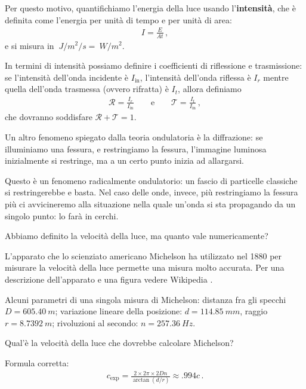 \documentclass{article}
\begin{document}
Per questo motivo, quantifichiamo l'energia della luce usando l'\textbf{intensità}, che è definita come l'energia per unità di tempo e per unità di area: 
%
\begin{align}
I = \frac{E}{A t}
\,,
\end{align}
%
e si misura in \(\SI{}{J / m^2 / s}  = \SI{}{W/m^2}\). 

In termini di intensità possiamo definire i coefficienti di riflessione e trasmissione: se l'intensità dell'onda incidente è \(I _{\text{in}}\), l'intensità dell'onda riflessa è \(I_{r}\) mentre quella dell'onda trasmessa (ovvero rifratta) è \(I_{t}\), allora definiamo 
%
\begin{align}
\mathcal{R} = \frac{I_r}{I _{\text{in}}}
\qquad \text{e} \qquad
\mathcal{T} = \frac{I_t}{I _{\text{in}}}
\,,
\end{align}
%
che dovranno soddisfare \(\mathcal{R} + \mathcal{T} = 1\).

Un altro fenomeno spiegato dalla teoria ondulatoria è la diffrazione: se illuminiamo una fessura, e restringiamo la fessura, l'immagine luminosa inizialmente si restringe, ma a un certo punto inizia ad allargarsi.

Questo è un fenomeno radicalmente ondulatorio: un fascio di particelle classiche si restringerebbe e basta.
Nel caso delle onde, invece, più restringiamo la fessura più ci avvicineremo alla situazione nella quale un'onda si sta propagando da un singolo punto: lo farà in cerchi. 

Abbiamo definito la velocità della luce, ma quanto vale numericamente? 

\begin{exo}


L'apparato che lo scienziato americano Michelson ha utilizzato nel 1880 \cite[]{michelsonExperimentalDeterminationVelocity1880} per misurare la velocità della luce permette una misura molto accurata.
Per una descrizione dell'apparato e una figura vedere Wikipedia \cite[figura 3]{wikipediacontributorsFizeauFoucaultApparatus2019}.

Alcuni parametri di una singola misura di Michelson: distanza fra gli specchi \(D = \SI{605.40}{m}\); variazione lineare della posizione: \(d = \SI{114.85}{mm}\), raggio \(r = \SI{8.7392}{m}\); rivoluzioni al secondo: \(n = \SI{257.36}{Hz}\).

Qual'è la velocità della luce che dovrebbe calcolare Michelson?

Formula corretta: 
%
\begin{align}
c _{\text{exp}} = \frac{2 \times 2 \pi \times 2 D n}{\arctan(d / r)} \approx \num{.994} c
\,.
\end{align}
\end{exo}
\end{document}
